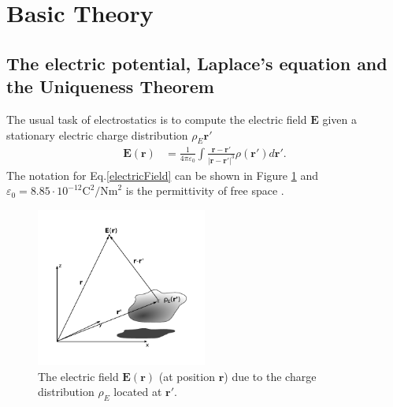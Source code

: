 \section{Basic Theory}
\subsection{The electric potential, Laplace's equation and the Uniqueness Theorem}
The usual task of electrostatics is to compute the electric field $\boldsymbol{E}$ given a 
stationary electric charge distribution $\rho_E{\boldsymbol{r'}}$
\begin{align}
   \label{electricField}
   \boldsymbol{E}(\boldsymbol{r}) 
   &= \frac{1}{4 \pi \varepsilon_0} \int \frac{\boldsymbol{r} - \boldsymbol{r'}}
                                              {\big|\boldsymbol{r} - \boldsymbol{r'}\big|^3} 
                                                           \rho(\boldsymbol{r'}) d\!\boldsymbol{r'}.
\end{align}
The notation for Eq.\eqref{electricField} can be shown in Figure \ref{fig:electricField}
and $\varepsilon_0 = 8.85 \cdot 10 ^{-12} \text{C}^2/\text{Nm}^2$ is the permittivity of free space
\cite[.~58-62]{Griffiths}.
%
\begin{figure}[h!]
  \centering
   \includegraphics[width=0.5\textwidth]{../Figures/electricFieldcoord.pdf}
   \caption{
      The electric field $\boldsymbol E (\boldsymbol r)$ (at position $\boldsymbol r$)
      due to the charge distribution $\rho_E$ located at $\boldsymbol{r'}$.
   }
   \label{fig:electricField}
\end{figure}

